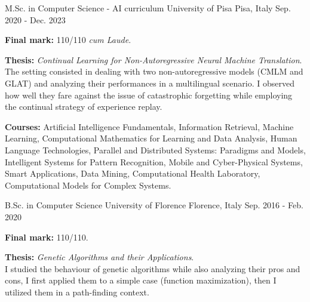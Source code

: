 

\begin{cventries}

\cventry
{M.Sc. in Computer Science - AI curriculum} %
{University of Pisa} %
{Pisa, Italy} %
{Sep. 2020 - Dec. 2023} %
{
    \begin{cvitems} %
        \item{\textbf{Final mark:} 110/110 \textit{cum Laude}.}
        \item{\textbf{Thesis:} \textit{Continual Learning for Non-Autoregressive Neural Machine Translation}.\\
        The setting consisted in dealing with two non-autoregressive models (CMLM and GLAT) and analyzing their performances in a multilingual scenario. I observed how well they fare against the issue of catastrophic forgetting while employing the continual strategy of experience replay.}
        \item{\textbf{Courses:} Artificial Intelligence Fundamentals, Information Retrieval, Machine Learning, Computational Mathematics for Learning and Data Analysis, Human Language Technologies, Parallel and Distributed Systems: Paradigms and Models, Intelligent Systems for Pattern Recognition, Mobile and Cyber-Physical Systems, Smart Applications, Data Mining, Computational Health Laboratory, Computational Models for Complex Systems.}
    \end{cvitems}
}

\cventry
{B.Sc. in Computer Science}
{University of Florence}
{Florence, Italy}
{Sep. 2016 - Feb. 2020}
{
    \begin{cvitems}
        \item{\textbf{Final mark:} 110/110.}
        \item{\textbf{Thesis:} \textit{Genetic Algorithms and their Applications}.\\
        I studied the behaviour of genetic algorithms while also analyzing their pros and cons, I first applied them to a simple case (function maximization), then I utilized them in a path-finding context.}
    \end{cvitems}
}


\end{cventries}
